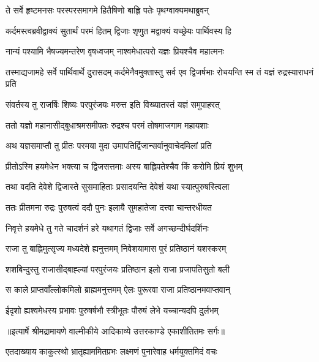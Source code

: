 \twolineshloka
{ते सर्वे हृष्टमनसः परस्परसमागमे}
{हितैषिणो बाह्लि पतेः पृथग्वाक्यमथाब्रुवन्} %

\twolineshloka
{कर्दमस्त्वब्रवीद्वाक्यं सुतार्थं परमं हितम्}
{द्विजाः शृणुत मद्वाक्यं यच्छ्रेयः पार्थिवस्य हि} %

\twolineshloka
{नान्यं पश्यामि भैषज्यमन्तरेण वृषध्वजम्}
{नाश्वमेधात्परो यज्ञः प्रियश्चैव महात्मनः} %

\threelineshloka
{तस्माद्यजामहे सर्वे पार्थिवार्थे दुरासदम्}
{कर्दमेनैवमुक्तास्तु सर्व एव द्विजर्षभाः}
{रोचयन्ति स्म तं यज्ञं रुद्रस्याराधनं प्रति} %

\twolineshloka
{संवर्तस्य तु राजर्षिः शिष्यः परपुरंजयः}
{मरुत्त इति विख्यातस्तं यज्ञं समुपाहरत्} %

\twolineshloka
{ततो यज्ञो महानासीद्बुधाश्रमसमीपतः}
{रुद्रश्च परमं तोषमाजगाम महायशाः} %

\twolineshloka
{अथ यज्ञसमाप्तौ तु प्रीतः परमया मुदा}
{उमापतिर्द्विजान्सर्वानुवाचेदमिलां प्रति} %

\twolineshloka
{प्रीतोऽस्मि हयमेधेन भक्त्या च द्विजसत्तमाः}
{अस्य बाह्लिपतेश्चैव किं करोमि प्रियं शुभम्} %

\twolineshloka
{तथा वदति देवेशे द्विजास्ते सुसमाहिताः}
{प्रसादयन्ति देवेशं यथा स्यात्पुरुषस्त्विला} %

\twolineshloka
{ततः प्रीतमना रुद्रः पुरुषत्वं ददौ पुनः}
{इलायै सुमहातेजा दत्त्वा चान्तरधीयत} %

\twolineshloka
{निवृत्ते हयमेधे तु गते चादर्शनं हरे}
{यथागतं द्विजाः सर्वे अगच्छन्दीर्घदर्शिनः} %

\twolineshloka
{राजा तु बाह्लिमुत्सृज्य मध्यदेशे ह्यनुत्तमम्}
{निवेशयामास पुरं प्रतिष्ठानं यशस्करम्} %

\twolineshloka
{शशबिन्दुस्तु राजासीद्बाह्ल्यां परपुरंजयः}
{प्रतिष्ठान इलो राजा प्रजापतिसुतो बली} %

\twolineshloka
{स काले प्राप्तवाँल्लोकमिलो ब्राह्ममनुत्तमम्}
{ऐलः पुरूरवा राजा प्रतिष्ठानमवाप्तवान्} %

\twolineshloka
{ईदृशो ह्यश्वमेधस्य प्रभावः पुरुषर्षभौ}
{स्त्रीभूतः पौरुषं लेभे यच्चान्यदपि दुर्लभम्} %


{॥इत्यार्षे श्रीमद्रामायणे वाल्मीकीये आदिकाव्ये उत्तरकाण्डे एकाशीतितमः सर्गः॥}


\twolineshloka
{एतदाख्याय काकुत्स्थो भ्रातृह्याममितप्रभः}
{लक्ष्मणं पुनारेवाह धर्मयुक्तमिदं वचः} %

